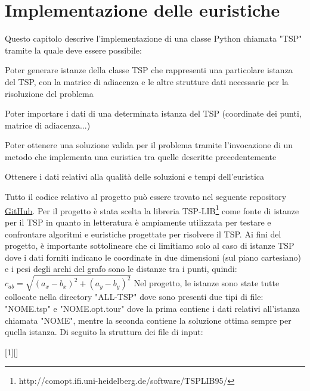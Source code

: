 \documentclass[a4paper,12pt]{report}
\begin{document}
\chapter{Implementazione delle euristiche}
Questo capitolo descrive l'implementazione di una classe Python chiamata "TSP" tramite la quale deve essere possibile:
\begin{legal}
  \item Poter generare istanze della classe TSP che rappresenti una particolare istanza del TSP, con la matrice di adiacenza e le altre strutture dati necessarie per la risoluzione del problema
  \item Poter importare i dati di una determinata istanza del TSP (coordinate dei punti, matrice di adiacenza...)
  \item Poter ottenere una soluzione valida per il problema tramite l'invocazione di un metodo che implementa una euristica tra quelle descritte precedentemente
  \item Ottenere i dati relativi alla qualità delle soluzioni e tempi dell'euristica
\end{legal}
Tutto il codice relativo al progetto può essere trovato nel seguente repository \href{https://github.com/cohenasaf/Furthest-insertion}{GitHub}. Per il progetto è stata scelta la libreria TSP-LIB\footnote{http://comopt.ifi.uni-heidelberg.de/software/TSPLIB95/} come fonte di istanze per il TSP in quanto in letteratura è ampiamente utilizzata per testare e confrontare algoritmi e euristiche progettate per risolvere il TSP. Ai fini del progetto, è importante sottolineare che ci limitiamo solo al caso di istanze TSP dove i dati forniti indicano le coordinate in due dimensioni (sul piano cartesiano) e i pesi degli archi del grafo sono le distanze tra i punti, quindi: $c_{ab} = \sqrt{(a_x - b_x)^2 + (a_y - b_y)^2}$ Nel progetto, le istanze sono state tutte collocate nella directory "ALL-TSP" dove sono presenti due tipi di file: "NOME.tsp" e "NOME.opt.tour" dove la prima contiene i dati relativi all'istanza chiamata "NOME", mentre la seconda contiene la soluzione ottima sempre per quella istanza. Di seguito la struttura dei file di input:


[1][]{%
  \lstset{
    basicstyle=\ttfamily,
    frame=tb,
    #1
  }%
}{}
\end{document}
